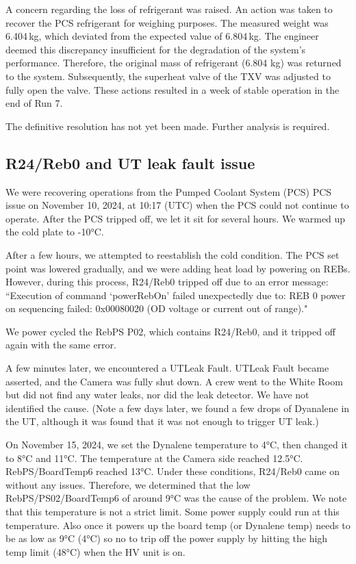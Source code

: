 A concern regarding the loss of refrigerant was raised. An action was taken to recover the PCS refrigerant for weighing purposes. The measured weight was 6.404\,kg, which deviated from the expected value of 6.804\,kg. The engineer deemed this discrepancy insufficient for the degradation of the system's performance. Therefore, the original mass of refrigerant (6.804 kg) was returned to the system. Subsequently, the superheat valve of the TXV was adjusted to fully open the valve. These actions resulted in a week of stable operation in the end of Run 7.

The definitive resolution has not yet been made. Further analysis is required.


\clearpage
\subsection{R24/Reb0 and UT leak fault issue}\label{sec:lowtempissue}
We were recovering operations from the Pumped Coolant System (PCS) PCS issue on November 10, 2024, at 10:17 (UTC) when the PCS could not continue to operate. After the PCS tripped off, we let it sit for several hours. We warmed up the cold plate to -10°C.

After a few hours, we attempted to reestablish the cold condition. The PCS set point was lowered gradually, and we were adding heat load by powering on REBs. However, during this process, R24/Reb0 tripped off due to an error message: ``Execution of command `powerRebOn' failed unexpectedly due to: REB 0 power on sequencing failed: 0x00080020 (OD voltage or current out of range)."

We power cycled the RebPS P02, which contains R24/Reb0, and it tripped off again with the same error.

A few minutes later, we encountered a UTLeak Fault. UTLeak Fault became asserted, and the Camera was fully shut down. A crew went to the White Room but did not find any water leaks, nor did the leak detector. We have not identified the cause. (Note a few days later, we found a few drops of Dyanalene in the UT, although it was found that it was not enough to trigger UT leak.)

On November 15, 2024, we set the Dynalene temperature to 4°C, then changed it to 8°C and 11°C. The temperature at the Camera side reached 12.5°C. RebPS/BoardTemp6 reached 13°C. Under these conditions, R24/Reb0 came on without any issues. Therefore, we determined that the low RebPS/PS02/BoardTemp6 of around 9°C was the cause of the problem. We note that this temperature is not a strict limit. Some power supply could run at this temperature. Also once it powers up the board temp (or Dynalene temp) needs to be as low as 9°C (4°C) so no to trip off the power supply by hitting the high temp limit (48°C) when the HV unit is on.

